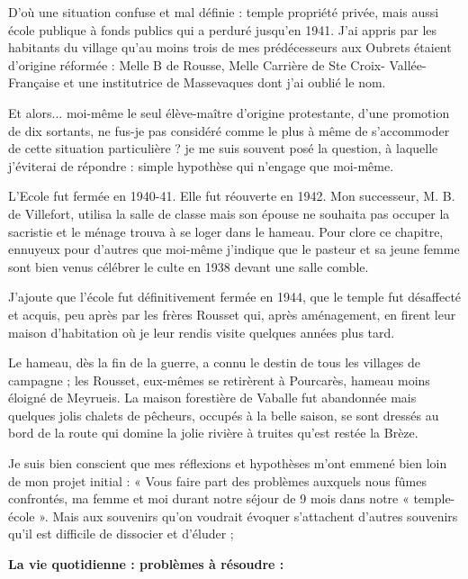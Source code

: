 D’où une situation confuse et mal définie : temple propriété privée, mais aussi école
publique à fonds publics qui a perduré jusqu’en 1941.
J’ai appris par les habitants du village qu’au moins trois de mes prédécesseurs aux
Oubrets étaient d’origine réformée : Melle B de Rousse, Melle Carrière de Ste Croix-
Vallée- Française et une institutrice de Massevaques dont j’ai oublié le nom.

Et alors... moi-même le seul élève-maître d’origine protestante, d’une promotion de
dix sortants, ne fus-je pas considéré comme le plus à même de s’accommoder de cette
situation particulière ? je me suis souvent posé la question, à laquelle j’éviterai de
répondre : simple hypothèse qui n’engage que moi-même.


L’Ecole fut fermée en 1940-41. Elle fut réouverte en 1942. Mon successeur, M. B. de
Villefort, utilisa la salle de classe mais son épouse ne souhaita pas occuper la sacristie
et le ménage trouva à se loger dans le hameau.
Pour clore ce chapitre, ennuyeux pour d’autres que moi-même j’indique que le
pasteur et sa jeune femme sont bien venus célébrer le culte en 1938 devant une salle
comble.

J’ajoute que l’école fut définitivement fermée en 1944, que le temple fut désaffecté et
acquis, peu après par les frères Rousset qui, après aménagement, en firent leur maison
d’habitation où je leur rendis visite quelques années plus tard.

Le hameau, dès la fin de la guerre, a connu le destin de tous les villages de
campagne ; les Rousset, eux-mêmes se retirèrent à Pourcarès, hameau moins éloigné
de Meyrueis. La maison forestière de Vaballe fut abandonnée mais quelques jolis
chalets de pêcheurs, occupés à la belle saison, se sont dressés au bord de la route qui
domine la jolie rivière à truites qu’est restée la Brèze.

Je suis bien conscient que mes réflexions et hypothèses m’ont emmené bien loin de
mon projet initial : « Vous faire part des problèmes auxquels nous fûmes confrontés,
ma femme et moi durant notre séjour de 9 mois dans notre « temple-école ». Mais aux
souvenirs qu’on voudrait évoquer s’attachent d’autres souvenirs qu’il est difficile de
dissocier et d’éluder ;

\begin{center}
\textbf{La vie quotidienne : problèmes à résoudre :}
\end{center}


